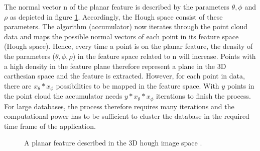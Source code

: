    The normal vector n of the planar feature is described by the parameters $\theta, \phi$ and $\rho$ as depicted in figure \ref{fig_HoughIm}. Accordingly, the Hough space consist of these parameters. The algorithm (accumulator) now iterates through the point cloud data and maps the possible normal vectors of each point in its feature space
   (Hough space). Hence, every time a point is on the planar feature, the density of the parameters ($\theta, \phi, \rho$) in the feature space related to n will increase. Points with a high density in the feature plane therefore represent a plane in the 3D carthesian space and the feature is extracted. However, for each point in data, there are 
   $x_\theta*x_\phi$ possibilities to be mapped in the feature space. With $y$ points in the point cloud the accumulator needs $y*x_\theta*x_\phi$ iterations to finish the process. For large databases, the process therefore requires many iterations and the computational power has to be sufficient to cluster the database in the required time frame of the application.
   \begin{figure}
   	\begin{centering}
   		\caption{A planar feature described in the 3D hough image space \cite{EnvPerc}.}
   		\label{fig_HoughIm}
   	\end{centering}
   \end{figure}

